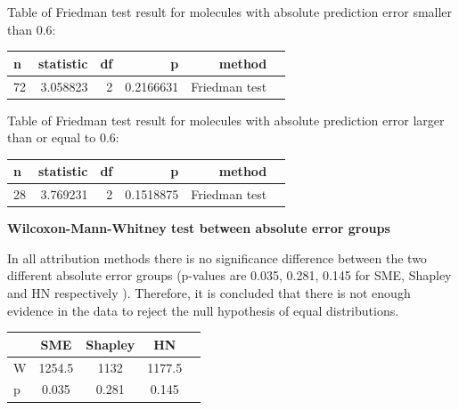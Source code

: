 Table of Friedman test result for molecules with absolute prediction
error smaller than \(0.6\):


\begin{center}
    \begin{table}[H]
\begin{tabular}{lrrrrl}
\toprule
 n & statistic & df & p & method \\
\midrule
 72 & 3.058823 & 2 & 0.2166631 & Friedman test \\
\bottomrule
\end{tabular}
\end{table}
\end{center}


Table of Friedman test result for molecules with absolute prediction
error larger than or equal to \(0.6\):


\begin{center}
    \begin{table}[H]
\begin{tabular}{lrrrrl}
\toprule
n & statistic & df & p & method \\
\midrule
28 & 3.769231 & 2 & 0.1518875 & Friedman test \\
\bottomrule
\end{tabular}
\end{table}
\end{center}


\textbf{Wilcoxon-Mann-Whitney test between absolute error groups}


In all attribution methods there is no significance difference between the two different
absolute error groups (p-values are 0.035, 0.281, 0.145 for SME, Shapley
and HN respectively ). Therefore, it is concluded that there is not enough evidence in
the data to reject the null hypothesis of equal distributions.

\begin{center}
    \begin{table}[H]
        \begin{tabular}{lcccl}
            \toprule
            &SME & Shapley & HN \\
            \midrule 
        W & 1254.5 & 1132 &  1177.5 \\
        p &  0.035 & 0.281 & 0.145 \\
        \bottomrule
    \end{tabular}
\end{table}
\end{center}
